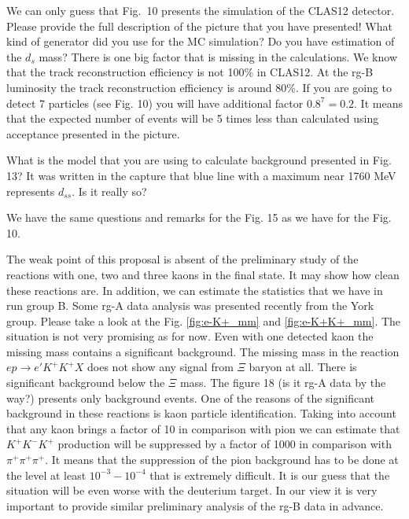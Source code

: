 \documentclass[prc,floatfix,superscriptaddress,letter]{revtex4}
\begin{document}
We can only guess that Fig.~10 presents the simulation of the CLAS12 detector. Please provide the full description of the picture that you have presented! What kind of generator did you use for the MC simulation?
Do you have estimation of the $d_s$ mass? 
There is one big factor that is missing in the calculations. We know that the track reconstruction efficiency
is not 100\% in CLAS12. At the rg-B luminosity the track reconstruction efficiency is around 80\%.
If you are going to detect 7 particles (see Fig. 10) you will have additional factor $0.8^7=0.2$. 
It means that the expected number of events will be 5 times less than calculated using acceptance presented in the picture.

What is the model that you are using to calculate background presented in Fig. 13?
It was written in the capture that blue line with a maximum near 1760 MeV represents $d_{ss}$. Is it really so?

We have the same questions and remarks for the Fig. 15 as we have for the Fig. 10.

The weak point of this proposal is absent of the preliminary study of the  reactions with one, two and three kaons in the final state. It may show how clean these reactions are. In addition, we can   estimate the statistics that
 we have in run group B. Some rg-A data analysis was presented recently from the York group.
 Please take a look at the Fig. \ref{fig:e-K+_mm} and \ref{fig:e-K+K+_mm}. The situation is not very promising as for now.
 Even with one detected kaon the missing mass contains a significant background.
 The missing mass in the reaction $ep\to e'K^+K^+X$ does not show any signal from $\Xi$ baryon at all.
 There is significant background below the $\Xi$ mass. The figure 18 (is it rg-A data by the way?) presents only background events. One of the reasons of the significant background in these reactions is kaon particle identification.
 Taking into account that any kaon brings a factor of 10 in comparison with pion   
 we can estimate that $K^+K^-K^+$ production will be suppressed by a factor of 1000 in comparison with $\pi^+\pi^+\pi^+$.
 It means that the suppression of the pion background has to be done at the level at least $10^{-3}-10^{-4}$ that is extremely difficult.
 It is our guess that the situation will be even worse with the deuterium target. In our view it is very important to provide similar preliminary analysis of the rg-B data in advance.
 
\end{document}
